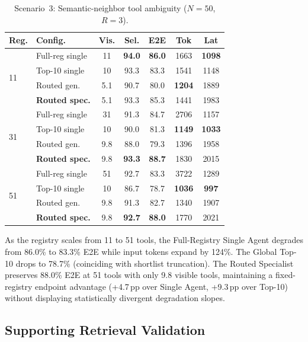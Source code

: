 \begin{table}[!htbp]
\centering
\caption{Scenario~3: Semantic-neighbor tool ambiguity ($N=50$, $R=3$).}
\label{tab:tool_ambiguity}
{\small\setlength{\tabcolsep}{3pt}
\begin{tabular}{llccccc}
\toprule
\textbf{Reg.} & \textbf{Config.} & \textbf{Vis.} & \textbf{Sel.} & \textbf{E2E} & \textbf{Tok} & \textbf{Lat} \\
\midrule
\multirow{4}{*}{11} & Full-reg single & 11 & \textbf{94.0} & \textbf{86.0} & 1663 & \textbf{1098} \\
 & Top-10 single   & 10 & 93.3 & 83.3 & 1541 & 1148 \\
 & Routed gen.     & 5.1 & 90.7 & 80.0 & \textbf{1204} & 1889 \\
 & \textbf{Routed spec.} & 5.1 & 93.3 & 85.3 & 1441 & 1983 \\
\midrule
\multirow{4}{*}{31} & Full-reg single & 31 & 91.3 & 84.7 & 2706 & 1157 \\
 & Top-10 single   & 10 & 90.0 & 81.3 & \textbf{1149} & \textbf{1033} \\
 & Routed gen.     & 9.8 & 88.0 & 79.3 & 1396 & 1958 \\
 & \textbf{Routed spec.} & 9.8 & \textbf{93.3} & \textbf{88.7} & 1830 & 2015 \\
\midrule
\multirow{4}{*}{51} & Full-reg single & 51 & 92.7 & 83.3 & 3722 & 1289 \\
 & Top-10 single   & 10 & 86.7 & 78.7 & \textbf{1036} & \textbf{997} \\
 & Routed gen.     & 9.8 & 91.3 & 82.7 & 1340 & 1907 \\
 & \textbf{Routed spec.} & 9.8 & \textbf{92.7} & \textbf{88.0} & 1770 & 2021 \\
\bottomrule
\end{tabular}}
\end{table}

As the registry scales from 11 to 51 tools, the Full-Registry Single Agent degrades from 86.0\% to 83.3\% E2E while input tokens expand by 124\%. The Global Top-10 drops to 78.7\% (coinciding with shortlist truncation). The Routed Specialist preserves 88.0\% E2E at 51 tools with only 9.8 visible tools, maintaining a fixed-registry endpoint advantage (+4.7\,pp over Single Agent, +9.3\,pp over Top-10) without displaying statistically divergent degradation slopes.

\subsection{Supporting Retrieval Validation}
\label{sec:retrieval_results}

